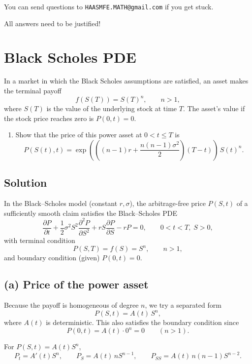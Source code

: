 \documentclass{article}
\begin{document}
\noindent You can send questions to \texttt{HAASMFE.MATH@gmail.com} if you get stuck.

\vspace{1em}

\noindent All answers need to be justified!

\newpage

\section{Black Scholes PDE}

In a market in which the Black Scholes assumptions are satisfied, an asset makes the terminal payoff
\[
f(S(T)) = S(T)^n,
\qquad n>1,
\]
where $S(T)$ is the value of the underlying stock at time $T$. The asset's value if the stock price reaches zero is $P(0,t)=0$.

\begin{enumerate}
\item[(a)] Show that the price of this power asset at $0<t\le T$ is
\[
P(S(t),t)=\exp\!\left(\left((n-1)r+\frac{n(n-1)\sigma^2}{2}\right)(T-t)\right)\,S(t)^n.
\]
\end{enumerate}


\subsection*{Solution}
In the Black--Scholes model (constant $r,\sigma$), the arbitrage-free price $P(S,t)$ of a sufficiently smooth claim
satisfies the Black--Scholes PDE
\[
\frac{\partial P}{\partial t}
+\frac12\sigma^2 S^2\frac{\partial^2 P}{\partial S^2}
+rS\frac{\partial P}{\partial S}
-rP
=0,
\qquad 0<t<T,\; S>0,
\]
with terminal condition
\[
P(S,T)=f(S)=S^n,\qquad n>1,
\]
and boundary condition (given) $P(0,t)=0$.



\subsection*{(a) Price of the power asset}


Because the payoff is homogeneous of degree $n$, we try a separated form
\[
P(S,t)=A(t)\,S^n,
\]
where $A(t)$ is deterministic.  This also satisfies the boundary condition since
\[
P(0,t)=A(t)\cdot 0^n=0 \qquad (n>1).
\]

For $P(S,t)=A(t)S^n$,
\[
P_t=A'(t)S^n,\qquad
P_S=A(t)\,nS^{n-1},\qquad
P_{SS}=A(t)\,n(n-1)S^{n-2}.
\]
\end{document}
